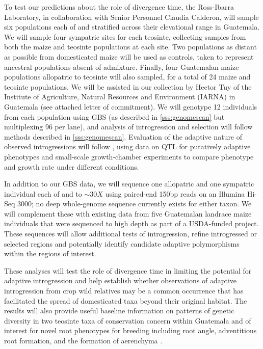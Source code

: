To test our predictions about the role of divergence time, the Ross-Ibarra Laboratory, in collaboration with Senior Personnel Claudia Calderon, will sample six populations each of \zl{} and \zh{} stratified across their elevational range in Guatemala.  
We will sample four sympatric sites for each teosinte, collecting samples from both the maize and teosinte populations at each site.
Two populations as distant as possible from domesticated maize will be used as controls, taken to represent ancestral populations absent of admixture.  
Finally, four Guatemalan maize populations allopatric to teosinte will also sampled, for a total of 24 maize and teosinte populations.
We will be assisted in our collection by Hector Tuy of the Institute of Agriculture, Natural Resources and Environment (IARNA) in Guatemala (see attached letter of commitment).
We will genotype 12 individuals from each population using GBS (as described in \ref{sss:genomescan} but multiplexing 96 per lane), and analysis of introgression and selection will follow methods described in \ref{sss:genomescan}.  
Evaluation of the adaptive nature of observed introgressions will follow \citet{Hufford2013}, using data on QTL for putatively adaptive phenotypes \citep{omori2007qtl,mano2008linkage} and small-scale growth-chamber experiments to compare phenotype and growth rate under different conditions.

In addition to our GBS data, we will sequence one allopatric and one sympatric individual each of \zl{} and \zh{} to $\sim30X$ using paired-end 150bp reads on an Illumina Hi-Seq 3000; no deep whole-genome sequence currently exists for either taxon.
We will complement these with existing data from five Guatemalan landrace maize individuals that were sequenced to high depth as part of a USDA-funded project.   These sequences will allow additional tests of introgression, refine introgressed or selected regions and potentially identify candidate adaptive polymorphisms within the regions of interest.

These analyses will test the role of divergence time in limiting the potential for adaptive introgression and help establish whether observations of adaptive introgression from crop wild relatives may be a common occurrence that has facilitated the spread of domesticated taxa beyond their original habitat.
The results will also provide useful baseline information on patterns of genetic diversity in two teosinte taxa of conservation concern within Guatemala and of interest for novel root phenotypes for breeding including root angle, adventitious root formation, and the formation of aerenchyma \citep{omori2007qtl,mano2007breeding}. 

